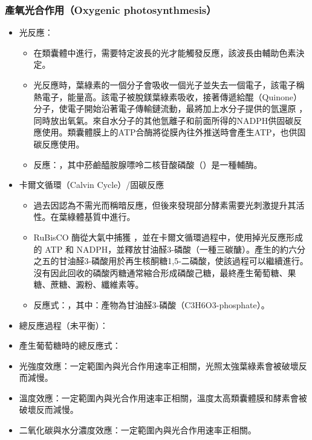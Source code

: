 \documentclass[a4paper,12pt]{report}
\begin{document}
\subsubsection{產氧光合作用（Oxygenic photosynthmesis）}
  \begin{itemize}
    \item 光反應：
\begin{itemize}
\item 在類囊體中進行，需要特定波長的光才能觸發反應，該波長由輔助色素決定。
\item 光反應時，葉綠素的一個分子會吸收一個光子並失去一個電子，該電子稱熱電子，能量高。該電子被脫鎂葉綠素吸收，接著傳遞給醌（Quinone）分子，使電子開始沿著電子傳輸鏈流動，最將加上水分子提供的氫還原 ，同時放出氧氣。來自水分子的其他氫離子和前面所得的NADPH供固碳反應使用。類囊體膜上的ATP合酶將從膜內往外推送時會產生ATP，也供固碳反應使用。
\item 反應：，其中菸鹼醯胺腺嘌呤二核苷酸磷酸（）是一種輔酶。
\end{itemize}
    \item 卡爾文循環（Calvin Cycle）/固碳反應
\begin{itemize}
\item 過去因認為不需光而稱暗反應，但後來發現部分酵素需要光刺激提升其活性。在葉綠體基質中進行。
\item RuBisCO 酶從大氣中捕獲 ，​​並在卡爾文循環過程中，使用掉光反應形成的 ATP 和 NADPH，並釋放甘油醛3-磷酸（一種三碳醣）。產生的約六分之五的甘油醛3-磷酸用於再生核酮糖1,5-二磷酸，使該過程可以繼續進行。沒有因此回收的磷酸丙糖通常縮合形成磷酸己糖，最終產生葡萄糖、果糖、蔗糖、澱粉、纖維素等。
\item 反應式：，其中：產物為甘油醛3-磷酸（C3H6O3-phosphate）。
\end{itemize}
    \item 總反應過程（未平衡）：
    \item 產生葡萄糖時的總反應式：
    \item 光強度效應：一定範圍內與光合作用速率正相關，光照太強葉綠素會被破壞反而減慢。
    \item 溫度效應：一定範圍內與光合作用速率正相關，溫度太高類囊體膜和酵素會被破壞反而減慢。
    \item 二氧化碳與水分濃度效應：一定範圍內與光合作用速率正相關。
\end{itemize}
\end{document}
